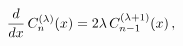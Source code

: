 \[\frac{d}{dx}\mathop{C^{(\lambda)}_{n}\/}\nolimits\!\left(x\right)=2\lambda%
\mathop{C^{(\lambda+1)}_{n-1}\/}\nolimits\!\left(x\right),\]